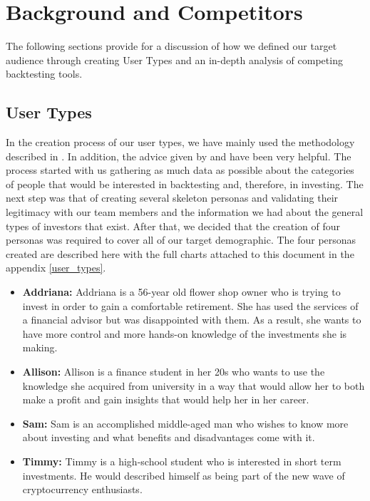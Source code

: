 \documentclass[main.tex]{subfiles}
\begin{document}
\section{Background and Competitors}

The following sections provide for a discussion of how we defined our target audience through creating User Types and an in-depth analysis of competing backtesting tools.

\subsection{User Types}

In the creation process of our user types, we have mainly used the methodology described in \cite{pathy}. In addition, the advice given by \cite{uiux_fundation} and \cite{user_types_interaction_design_fundation} have been very helpful. The process started with us gathering as much data as possible about the categories of people that would be interested in backtesting and, therefore, in investing. The next step was that of creating several skeleton personas \cite{personas} and validating their legitimacy with our team members and the information we had about the general types of investors that exist. After that, we decided that the creation of four personas was required to cover all of our target demographic.
The four personas created are described here with the full charts attached to this document in the appendix \ref{user_types}.
\begin{itemize}
\item \textbf{Addriana: }Addriana is a 56-year old flower shop owner who is trying to invest in order to gain a comfortable retirement. She has used the services of a financial advisor but was disappointed with them. As a result, she wants to have more control and more hands-on knowledge of the investments she is making.
\item \textbf{Allison: }Allison is a finance student in her 20s who wants to use the knowledge she acquired from university in a way that would allow her to both make a profit and gain insights that would help her in her career.
\item\textbf{Sam: }Sam is an accomplished middle-aged man who wishes to know more about investing and what benefits and disadvantages come with it. 
\item\textbf{Timmy: }Timmy is a high-school student who is interested in short term investments. He would described himself as being part of the new wave of cryptocurrency enthusiasts.
\end{itemize}
\end{document}
